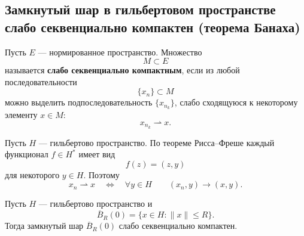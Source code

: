 \providecommand{\weakconv}{\rightharpoonup}
\providecommand{\K}{\mathbb{K}}

\subsection{Замкнутый шар в гильбертовом пространстве слабо секвенциально компактен (теорема Банаха)}

\begin{definition}
	Пусть \(E\) --- нормированное пространство. Множество
	\[
	M\subset E
	\]
	называется \textbf{слабо секвенциально компактным}, если из любой последовательности
	\[
	\{x_n\}\subset M
	\]
	можно выделить подпоследовательность \(\{x_{n_k}\}\), слабо сходящуюся к некоторому
	элементу \(x\in M\):
	\[
	x_{n_k}\weakconv x.
	\]
\end{definition}

\begin{remark}
	Пусть \(H\) --- гильбертово пространство. По теореме Рисса--Фреше каждый функционал
	\(f\in H^*\) имеет вид
	\[
	f(z)=(z,y)
	\]
	для некоторого \(y\in H\). Поэтому
	\[
	x_n\weakconv x
	\quad\Longleftrightarrow\quad
	\forall y\in H
	\qquad
	(x_n,y)\to(x,y).
	\]
\end{remark}

\begin{theorem}[Банаха]
	Пусть \(H\) --- гильбертово пространство и
	\[
	\overline{B}_R(0)=\{x\in H:\|x\|\leqslant R\}.
	\]
	Тогда замкнутый шар \(\overline{B}_R(0)\) слабо секвенциально компактен.
	
\end{theorem}


